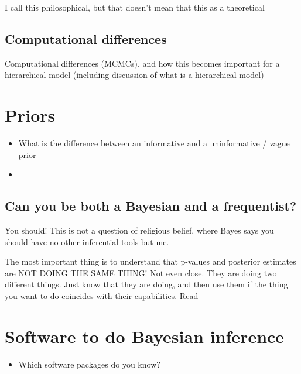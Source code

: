 \documentclass[10pt,a4paper]{article}
\begin{document}
I call this philosophical, but that doesn't mean that this as a theoretical

\subsection{Computational differences}

Computational differences (MCMCs), and how this becomes important for a hierarchical model (including discussion of what is a hierarchical model)

\section{Priors}

\begin{mdframed}[frametitle={Ask yourself}]
\begin{itemize}
  \item What is the difference between an informative and a uninformative / vague prior
  \item 
\end{itemize}
\end{mdframed}



\subsection{Can you be both a Bayesian and a frequentist?}

You should! This is not a question of religious belief, where Bayes says you should have no other inferential tools but me. 

The most important thing is to understand that p-values and posterior estimates are NOT DOING THE SAME THING! Not even close. They are doing two different things. Just know that they are doing, and then use them if the thing you want to do coincides with their capabilities. Read \citep{Kass-Statisticalinferencebig-2011}


\section{Software to do Bayesian inference}

\begin{mdframed}[frametitle={Ask yourself}]
\begin{itemize}
  \item Which software packages do you know?
\end{itemize}
\end{mdframed}
\end{document}
